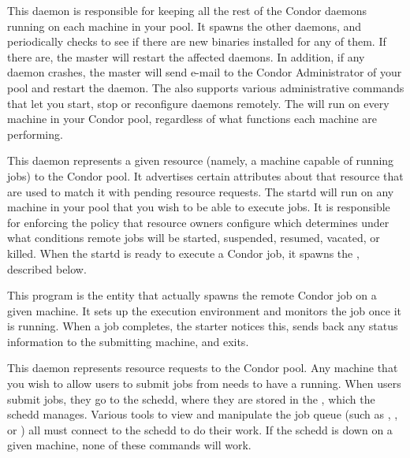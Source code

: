 \begin{description} 

\item[\Condor{master}] This daemon
is responsible for keeping all the
rest of the Condor daemons running on each machine in your pool.  It
spawns the other daemons, and periodically checks to see if there are
new binaries installed for any of them.  If there are, the master will
restart the affected daemons.  In addition, if any daemon crashes, the
master will send e-mail to the Condor Administrator of your pool and
restart the daemon.  The  also supports various
administrative commands that let you start, stop or reconfigure
daemons remotely.  The  will run on every machine in
your Condor pool, regardless of what functions each machine are
performing.  

\item[\Condor{startd}] This daemon
represents a given resource
(namely, a machine capable of running jobs) to the Condor pool.  It
advertises certain attributes about that resource that are used to
match it with pending resource requests.  The startd will run on any
machine in your pool that you wish to be able to execute jobs.  It is
responsible for enforcing the policy that resource owners configure
which determines under what conditions remote jobs will be started,
suspended, resumed, vacated, or killed.  When the startd is ready to
execute a Condor job, it spawns the , described below.

\item[\Condor{starter}] This program
is the entity that actually
spawns the remote Condor job on a given machine.  It sets up the
execution environment and monitors the job once it is running.  When a
job completes, the starter notices this, sends back any status
information to the submitting machine, and exits.

\item[\Condor{schedd}] This daemon
represents resource requests to
the Condor pool.  Any machine that you wish to allow users to submit
jobs from needs to have a  running.  When users submit
jobs, they go to the schedd, where they are stored in the , which the schedd manages.  Various tools to view and
manipulate the job queue (such as , , or
) all must connect to the schedd to do their work.  If the
schedd is down on a given machine, none of these commands will work.  


\end{description}
